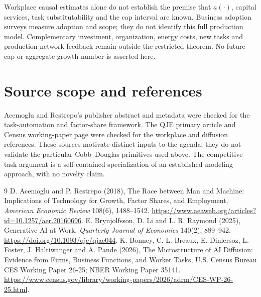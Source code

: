 \documentclass[11pt]{article}
\theoremstyle{remark}\newtheorem{remark}[theorem]{Remark}
\begin{document}
Workplace causal estimates alone do not establish the premise that $a(\cdot)$, capital services, task substitutability and the cap interval are known. Business adoption surveys measure adoption and scope; they do not identify this full production model. Complementary investment, organization, energy costs, new tasks and production-network feedback remain outside the restricted theorem. No future cap or aggregate growth number is asserted here.

\section*{Source scope and references}
Acemoglu and Restrepo's publisher abstract and metadata were checked for the task-automation and factor-share framework. The QJE primary article and Census working-paper page were checked for the workplace and diffusion references. These sources motivate distinct inputs to the agenda; they do not validate the particular Cobb--Douglas primitives used above. The competitive task argument is a self-contained specialization of an established modeling approach, with no novelty claim.
\begin{thebibliography}{9}
 D. Acemoglu and P. Restrepo (2018), The Race between Man and Machine: Implications of Technology for Growth, Factor Shares, and Employment, \emph{American Economic Review} 108(6), 1488--1542. \url{https://www.aeaweb.org/articles?id=10.1257/aer.20160696}.
 E. Brynjolfsson, D. Li and L. R. Raymond (2025), Generative AI at Work, \emph{Quarterly Journal of Economics} 140(2), 889--942. \url{https://doi.org/10.1093/qje/qjae044}.
 K. Bonney, C. L. Breaux, E. Dinlersoz, L. Foster, J. Haltiwanger and A. Pande (2026), The Microstructure of AI Diffusion: Evidence from Firms, Business Functions, and Worker Tasks, U.S. Census Bureau CES Working Paper 26-25; NBER Working Paper 35141. \url{https://www.census.gov/library/working-papers/2026/adrm/CES-WP-26-25.html}.
\end{thebibliography}
\end{document}

